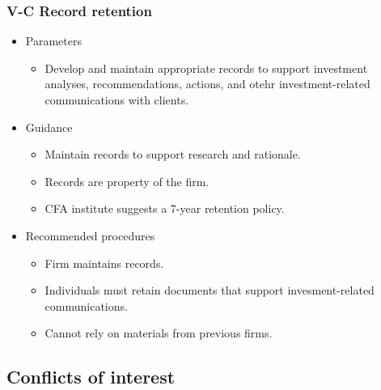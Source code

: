 \documentclass[../notes_compiled.tex]{subfiles}
\begin{document}
\subsubsection{V-C Record retention}
\begin{itemize}
\item Parameters
\begin{itemize}
\item Develop and maintain appropriate records to support investment analyses, recommendations, actions, and otehr investment-related communications with clients.
\end{itemize}
\item Guidance
\begin{itemize}
\item Maintain records to support research and rationale.
\item Records are property of the firm.
\item CFA institute suggests a 7-year retention policy.
\end{itemize}
\item Recommended procedures
\begin{itemize}
\item Firm maintains records.
\item Individuals must retain documents that support invesment-related communications.
\item Cannot rely on materials from previous firms.
\end{itemize}
\end{itemize}
\subsection{Conflicts of interest}
\end{document}
